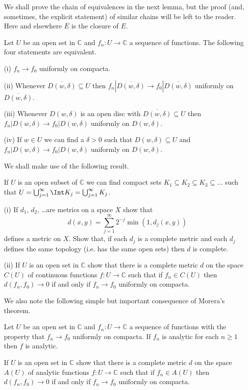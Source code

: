 We shall prove the chain of equivalences in the next lemma,
but the proof (and, sometimes, the explicit statement)
of similar chains will be left to the reader.
Here and elsewhere $\overline{E}$ is the closure
of $E$.
\begin{lemma} Let $U$ be an open set
in ${\mathbb C}$ and $f_{n}:U\rightarrow {\mathbb C}$
a sequence of functions. The following four
statements are equivalent.

(i) $f_{n}\rightarrow f_{0}$ uniformly on compacta. 

(ii) Whenever 
$\overline{D(w,\delta)}\subseteq U$
then $f_{n}|\overline{D(w,\delta)}
\rightarrow f_{0}|\overline{D(w,\delta)}$ 
uniformly on $\overline{D(w,\delta)}$.

(iii) Whenever $D(w,\delta)$ is 
an open disc with $\overline{D(w,\delta)}\subseteq U$
then $f_{n}|D(w,\delta)
\rightarrow f_{0}|D(w,\delta)$ 
uniformly on $D(w,\delta)$.

(iv) If $w\in U$ we can find a $\delta>0$ such that
$D(w,\delta)\subseteq U$ and $f_{n}|D(w,\delta)
\rightarrow f_{0}|D(w,\delta)$ 
uniformly on $D(w,\delta)$.
\end{lemma}
We shall make use of the following  result.
\begin{lemma} If $U$ is an open subset of ${\mathbb C}$
we can find compact sets $K_{1}\subseteq K_{2}
\subseteq K_{3}\subseteq\dots$ such that 
$U=\bigcup_{j=1}^{\infty}\Int K_{j}=\bigcup_{j=1}^{\infty}K_{j}$.
\end{lemma}
\begin{exercise}\label{uniform on compacta metric} 
(i) If $d_{1}$, $d_{2}$, \dots are
metrics on a space $X$ show that
\[d(x,y)=\sum_{j=1}^{\infty}2^{-j}\min(1,d_{j}(x,y))\]
defines a metric on $X$. Show that, if each $d_{j}$
is a complete metric and each $d_{j}$ defines the same
topology (i.e. has the same open sets)
then $d$ is complete.

(ii) If $U$ is an open set in ${\mathbb C}$ show that
there is a complete metric $d$ on the space $C(U)$
of continuous functions $f:U\rightarrow{\mathbb C}$
such that if $f_{n}\in C(U)$ then $d(f_{n},f_{0})\rightarrow 0$
if and only if $f_{n}\rightarrow f_{0}$ uniformly on 
compacta.
\end{exercise}
We also note the following simple but important 
consequence of Morera's theorem.
\begin{lemma} Let $U$ be an open set
in ${\mathbb C}$ and $f_{n}:U\rightarrow {\mathbb C}$
a sequence of functions with the property that
$f_{n}\rightarrow f_{0}$ uniformly on compacta.
If $f_{n}$ is analytic for each $n\geq 1$
then $f$ is analytic.
\end{lemma}
\begin{exercise}\label{exercise compacta} If $U$ is an open set 
in ${\mathbb C}$ show that
there is a complete metric $d$ on the space $A(U)$
of analytic functions $f:U\rightarrow{\mathbb C}$
such that if $f_{n}\in A(U)$ then $d(f_{n},f_{0})\rightarrow 0$
if and only if $f_{n}\rightarrow f_{0}$ uniformly on 
compacta.
\end{exercise}
 

